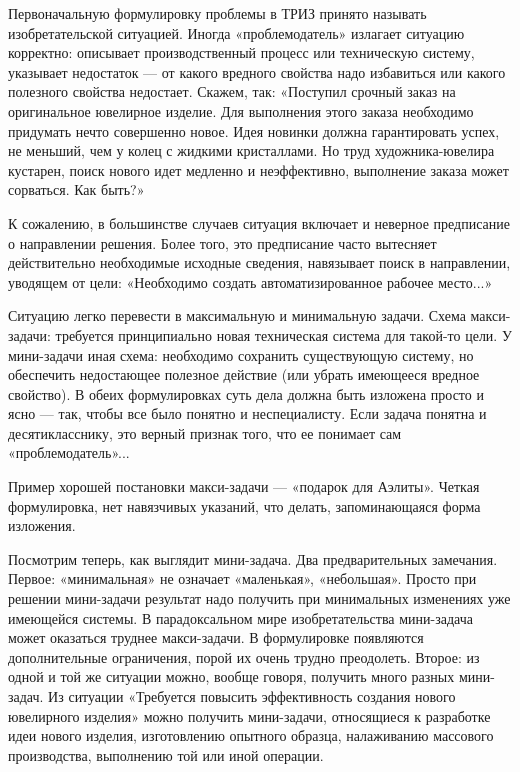 Первоначальную   формулировку  проблемы   в   ТРИЗ  принято   называть
изобретательской ситуацией. Иногда  «проблемодатель» излагает ситуацию
корректно: описывает производственный процесс или техническую систему,
указывает недостаток — от какого вредного свойства надо избавиться или
какого полезного  свойства недостает.  Скажем, так:  «Поступил срочный
заказ на  оригинальное ювелирное изделие. Для  выполнения этого заказа
необходимо  придумать  нечто  совершенно новое.  Идея  новинки  должна
гарантировать успех,  не меньший, чем  у колец с  жидкими кристаллами.
Но  труд  художника-ювелира кустарен,  поиск  нового  идет медленно  и
неэффективно, выполнение заказа может сорваться. Как быть?»

К  сожалению,  в  большинстве  случаев ситуация  включает  и  неверное
предписание о  направлении решения. Более того,  это предписание часто
вытесняет  действительно  необходимые  исходные  сведения,  навязывает
поиск   в  направлении,   уводящем   от   цели:  «Необходимо   создать
автоматизированное рабочее место...»

Ситуацию легко  перевести в  максимальную и минимальную  задачи. Схема
макси-задачи:  требуется принципиально  новая техническая  система для
такой-то  цели.   У  мини-задачи  иная  схема:   необходимо  сохранить
существующую систему, но обеспечить недостающее полезное действие (или
убрать имеющееся  вредное свойство).  В обеих формулировках  суть дела
должна быть  изложена просто и  ясно — так,  чтобы все было  понятно и
неспециалисту.  Если  задача  понятна и  десятикласснику,  это  верный
признак того, что ее понимает сам «проблемодатель»...

Пример хорошей постановки макси-задачи  — «подарок для Аэлиты». Четкая
формулировка,  нет  навязчивых  указаний, что  делать,  запоминающаяся
форма изложения.

Посмотрим  теперь,  как   выглядит  мини-задача.  Два  предварительных
замечания. Первое: «минимальная» не означает «маленькая», «небольшая».
Просто   при  решении   мини-задачи   результат   надо  получить   при
минимальных изменениях  уже имеющейся  системы. В  парадоксальном мире
изобретательства мини-задача  может оказаться труднее  макси-задачи. В
формулировке  появляются дополнительные  ограничения,  порой их  очень
трудно преодолеть.  Второе: из одной  и той же ситуации  можно, вообще
говоря,  получить  много  разных мини-задач.  Из  ситуации  «Требуется
повысить  эффективность  создания  нового  ювелирного  изделия»  можно
получить мини-задачи,  относящиеся к  разработке идеи  нового изделия,
изготовлению  опытного  образца, налаживанию  массового  производства,
выполнению той или иной операции.


